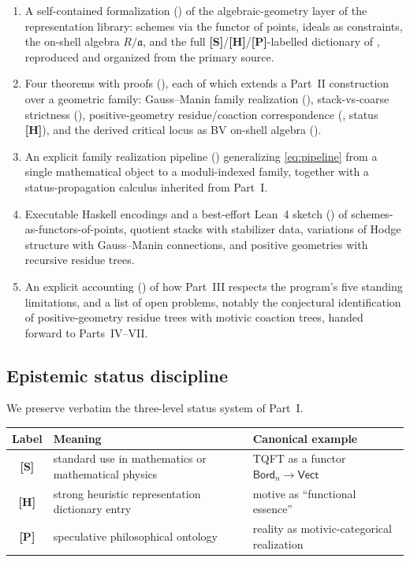 \documentclass[12pt]{article}
\theoremstyle{definition}
\theoremstyle{remark}
\newcommand{\Vect}{\mathsf{Vect}}
\newcommand{\Ideal}{\mathfrak{a}}
\newcommand{\status}[1]{\textnormal{\textsf{\textbf{[#1]}}}}
\begin{document}
\begin{enumerate}
  \item A self-contained formalization () of the algebraic-geometry
  layer of the representation library: schemes via the functor of points, ideals as constraints, the
  on-shell algebra $R/\Ideal$, and the full \status{S}/\status{H}/\status{P}-labelled dictionary of
  , reproduced and organized from the primary source.
  \item Four theorems with proofs (), each of which extends a Part~II construction
  over a geometric family: Gauss--Manin family realization (), stack-vs-coarse strictness
  (), positive-geometry residue/coaction correspondence (,
  status \status{H}), and the derived critical locus as BV on-shell algebra ().
  \item An explicit family realization pipeline () generalizing
  \eqref{eq:pipeline} from a single mathematical object to a moduli-indexed family, together with a
  status-propagation calculus inherited from Part~I.
  \item Executable \textsf{Haskell} encodings and a best-effort \textsf{Lean~4} sketch
  () of schemes-as-functors-of-points, quotient stacks with stabilizer data,
  variations of Hodge structure with Gauss--Manin connections, and positive geometries with recursive
  residue trees.
  \item An explicit accounting () of how Part~III respects the program's five
  standing limitations, and a list of open problems, notably the conjectural identification of
  positive-geometry residue trees with motivic coaction trees, handed forward to Parts~IV--VII.
\end{enumerate}

\subsection{Epistemic status discipline}
\label{sec:status-intro}

We preserve verbatim the three-level status system of Part~I.

\begin{center}
\begin{tabular}{c P{5.6cm} P{5.4cm}}
\hline
\textbf{Label} & \textbf{Meaning} & \textbf{Canonical example} \\
\hline
\status{S} & standard use in mathematics or mathematical physics & TQFT as a functor $\mathsf{Bord}_n\to\Vect$ \\
\status{H} & strong heuristic representation dictionary entry & motive as ``functional essence'' \\
\status{P} & speculative philosophical ontology & reality as motivic-categorical realization \\
\hline
\end{tabular}
\end{center}
\end{document}
